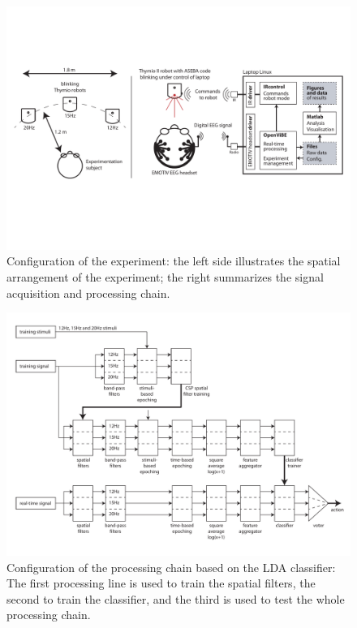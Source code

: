 \documentclass[smallextended]{svjour3}
\begin{document}
\begin{figure}
\center
\includegraphics[width=\textwidth]{figures/schema-global.pdf}
\caption{Configuration of the experiment: the left side illustrates the spatial arrangement of the experiment; the right summarizes the signal acquisition and processing chain.} \label{fig:thymioinstall}
\end{figure}

\begin{figure}
\center
\includegraphics[width=\textwidth]{figures/schema-openvibe.pdf}
\caption{Configuration of the processing chain based on the LDA classifier: The first processing line is used to train the spatial filters, the second to train the classifier, and the third is used to test the whole processing chain.} \label{fig:LDA}
\end{figure}
\end{document}
